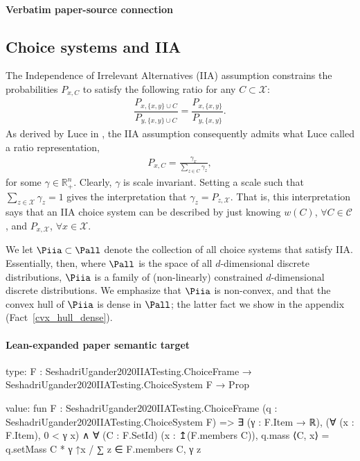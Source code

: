 \documentclass[10pt]{article}
\begin{document}
\paragraph{Verbatim paper-source connection}
\begin{ReviewVerbatim}
\subsection{Choice systems and IIA}
	The Independence of Irrelevant Alternatives (IIA) assumption constrains the probabilities $P_{x,C}$ to satisfy the following ratio for any $C \subset \mathcal{X}$:
	\begin{align*}
	\dfrac{P_{x,\lbrace x, y \rbrace \cup C}}{P_{y,\lbrace x, y \rbrace \cup C}} = \dfrac{P_{x,\lbrace x, y \rbrace}}{P_{y,\lbrace x, y \rbrace}}.
	\end{align*}
	As derived by Luce in \cite{luce1959individual}, the IIA assumption consequently admits what Luce called a ratio representation,
	\begin{align*}
	P_{x,C} = \frac{\gamma_x}{\sum_{z \in C} \gamma_z},
	\end{align*}
	for some $\gamma \in \mathbb{R}_+^n$. Clearly, $\gamma$ is scale invariant. Setting a scale such that $\sum_{z \in \mathcal{X}} \gamma_z = 1$ gives the interpretation that $\gamma_z = P_{z, \mathcal{X}}$.
	That is, this interpretation says that an IIA choice system can be described by just knowing $w(C)$, $\forall  C \in \mathcal{C}$, and $P_{x,\mathcal{X}}$, $\forall x \in \mathcal X$.

	We let $\Piia \subset \Pall$ denote the collection of all choice systems that satisfy IIA. Essentially, then, where $\Pall$ is the space of all $d$-dimensional discrete distributions, $\Piia$ is a family of (non-linearly) constrained $d$-dimensional discrete distributions. We emphasize that $\Piia$ is non-convex, and that the convex hull of $\Piia$ is dense in $\Pall$; the latter fact we show in the appendix (Fact~\ref{cvx_hull_dense}).
\end{ReviewVerbatim}



\paragraph{Lean-expanded paper semantic target}
\begin{ReviewVerbatim}
type:
{F : SeshadriUgander2020IIATesting.ChoiceFrame} → SeshadriUgander2020IIATesting.ChoiceSystem F → Prop

value:
fun {F : SeshadriUgander2020IIATesting.ChoiceFrame} (q : SeshadriUgander2020IIATesting.ChoiceSystem F) =>
  ∃ (γ : F.Item → ℝ),
    (∀ (x : F.Item), 0 < γ x) ∧
      ∀ (C : F.SetId) (x : ↥(F.members C)), q.mass ⟨C, x⟩ = q.setMass C * γ ↑x / ∑ z ∈ F.members C, γ z
\end{ReviewVerbatim}
\end{document}
